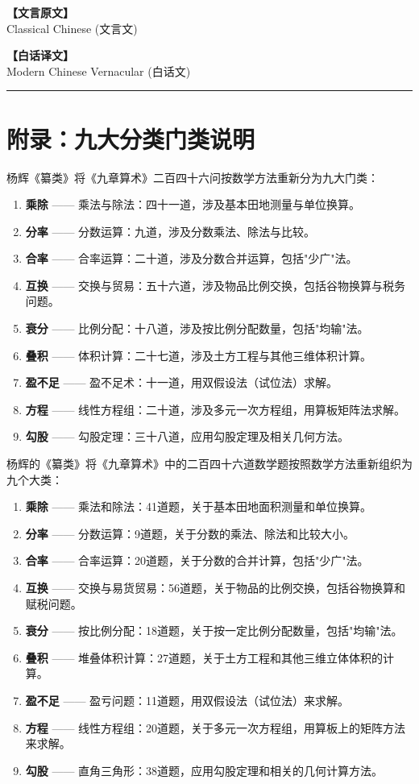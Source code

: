 \documentclass[11pt,a4paper]{article}
\newcommand{\colheader}{%
  \begin{center}
  \begin{minipage}[t]{0.45\textwidth}
  \centering\textcolor{colheadcl}{\textbf{【文言原文】}}\\[2pt]
  \footnotesize\textcolor{colheadcl}{Classical Chinese (文言文)}
  \end{minipage}%
  \hfill%
  \begin{minipage}[t]{0.45\textwidth}
  \centering\textcolor{colheadmd}{\textbf{【白话译文】}}\\[2pt]
  \footnotesize\textcolor{colheadmd}{Modern Chinese Vernacular (白话文)}
  \end{minipage}
  \end{center}
  \vspace{6pt}
  \noindent\rule{\textwidth}{0.4pt}
  \vspace{6pt}
}
\newcommand{\bilingual}[2]{%
\noindent
\begin{minipage}[t]{0.45\textwidth}
\setlength{\parindent}{2em}\setlength{\parskip}{4pt}%
\small\color{prefacecolor}#1%
\end{minipage}%
\hfill
\begin{minipage}[t]{0.45\textwidth}
\setlength{\parindent}{2em}\setlength{\parskip}{4pt}%
\small#2%
\end{minipage}
\vspace{8pt}
}
\begin{document}
\newpage
\colheader

\section*{附录：九大分类门类说明}

\bilingual{%
杨辉《纂类》将《九章算术》二百四十六问按数学方法重新分为九大门类：

\begin{enumerate}[leftmargin=*]
\item \textbf{乘除} —— 乘法与除法：四十一道，涉及基本田地测量与单位换算。
\item \textbf{分率} —— 分数运算：九道，涉及分数乘法、除法与比较。
\item \textbf{合率} —— 合率运算：二十道，涉及分数合并运算，包括"少广"法。
\item \textbf{互换} —— 交换与贸易：五十六道，涉及物品比例交换，包括谷物换算与税务问题。
\item \textbf{衰分} —— 比例分配：十八道，涉及按比例分配数量，包括"均输"法。
\item \textbf{叠积} —— 体积计算：二十七道，涉及土方工程与其他三维体积计算。
\item \textbf{盈不足} —— 盈不足术：十一道，用双假设法（试位法）求解。
\item \textbf{方程} —— 线性方程组：二十道，涉及多元一次方程组，用算板矩阵法求解。
\item \textbf{勾股} —— 勾股定理：三十八道，应用勾股定理及相关几何方法。
\end{enumerate}
}{%
杨辉的《纂类》将《九章算术》中的二百四十六道数学题按照数学方法重新组织为九个大类：

\begin{enumerate}[leftmargin=*]
\item \textbf{乘除} —— 乘法和除法：41道题，关于基本田地面积测量和单位换算。
\item \textbf{分率} —— 分数运算：9道题，关于分数的乘法、除法和比较大小。
\item \textbf{合率} —— 合率运算：20道题，关于分数的合并计算，包括"少广"法。
\item \textbf{互换} —— 交换与易货贸易：56道题，关于物品的比例交换，包括谷物换算和赋税问题。
\item \textbf{衰分} —— 按比例分配：18道题，关于按一定比例分配数量，包括"均输"法。
\item \textbf{叠积} —— 堆叠体积计算：27道题，关于土方工程和其他三维立体体积的计算。
\item \textbf{盈不足} —— 盈亏问题：11道题，用双假设法（试位法）来求解。
\item \textbf{方程} —— 线性方程组：20道题，关于多元一次方程组，用算板上的矩阵方法来求解。
\item \textbf{勾股} —— 直角三角形：38道题，应用勾股定理和相关的几何计算方法。
\end{enumerate}
}
\end{document}
